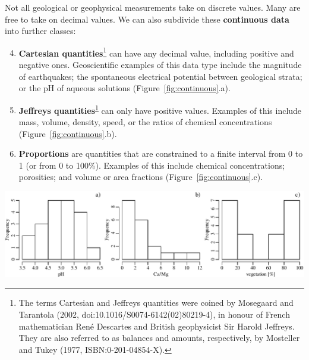 Not all geological or geophysical measurements take on discrete
values.  Many are free to take on decimal values. We can also
subdivide these \textbf{continuous data} into further classes:

\begin{enumerate}
  \setcounter{enumi}{3}
\item\textbf{Cartesian quantities}\footnote{The terms Cartesian and
Jeffreys quantities were coined by Mosegaard and Tarantola (2002,
doi:10.1016/S0074-6142(02)80219-4), in honour of French mathematician
Ren\'{e} Descartes and British geophysicist Sir Harold Jeffreys. They
are also referred to as balances and amounts, respectively, by
Mosteller and Tukey (1977, ISBN:0-201-04854-X).\label{ftn:Tarantola}}
  can have any decimal value, including positive and negative
  ones. Geoscientific examples of this data type include the magnitude
  of earthquakes; the spontaneous electrical potential between
  geological strata; or the pH of aqueous solutions
  (Figure~\ref{fig:continuous}.a).
  
\item\textbf{Jeffreys quantities}\textsuperscript{\ref{ftn:Tarantola}}
  can only have positive values. Examples of this include mass,
  volume, density, speed, or the ratios of chemical concentrations
  (Figure~\ref{fig:continuous}.b).
  
\item\textbf{Proportions} are quantities that are constrained to a
  finite interval from 0 to 1 (or from 0 to 100\%). Examples of this
  include chemical concentrations; porosities; and volume or area
  fractions (Figure~\ref{fig:continuous}.c).
\end{enumerate}

\noindent\includegraphics[width=\textwidth]{../figures/continuous.pdf}\medskip
\begingroup {}
\label{fig:continuous}
\endgroup

